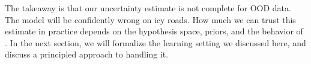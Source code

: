 The takeaway is that our uncertainty estimate is not complete for OOD data. The model will be confidently wrong on icy roads. How much we can trust this estimate in practice depends on the hypothesis space, priors, and the behavior of . In the next section, we will formalize the learning setting we discussed here, and discuss a principled approach to handling it.





